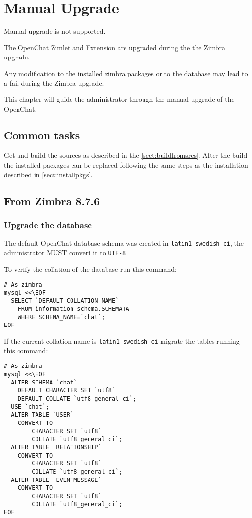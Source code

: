 \section{Manual Upgrade}

\begin{comment}
WARNING:
\end{comment}
\begin{warning}
    Manual upgrade is not supported.

    The OpenChat Zimlet and Extension are upgraded during the the Zimbra upgrade.

    Any modification to the installed zimbra packages or to the database may lead to a fail during the Zimbra upgrade.
\end{warning}

This chapter will guide the administrator through the manual upgrade of the OpenChat.

\subsection{Common tasks}

    Get and build the sources as described in the \autoref{sect:buildfromsrcs}. After the build the installed packages
    can be replaced following the same steps as the installation described in \autoref{sect:installpkgs}.

\subsection{From Zimbra 8.7.6}
    \subsubsection{Upgrade the database}

        The default OpenChat database schema was created in \verb+latin1_swedish_ci+, the administrator MUST convert it to \verb+UTF-8+

        To verify the collation of the database run this command:
        \begin{verbatim}
# As zimbra
mysql <<\EOF
  SELECT `DEFAULT_COLLATION_NAME`
    FROM information_schema.SCHEMATA
    WHERE SCHEMA_NAME=`chat`;
EOF
        \end{verbatim}

        If the current collation name is \verb+latin1_swedish_ci+ migrate the tables running this command:
        \begin{verbatim}
# As zimbra
mysql <<\EOF
  ALTER SCHEMA `chat`
    DEFAULT CHARACTER SET `utf8`
    DEFAULT COLLATE `utf8_general_ci`;
  USE `chat`;
  ALTER TABLE `USER`
    CONVERT TO
        CHARACTER SET `utf8`
        COLLATE `utf8_general_ci`;
  ALTER TABLE `RELATIONSHIP`
    CONVERT TO
        CHARACTER SET `utf8`
        COLLATE `utf8_general_ci`;
  ALTER TABLE `EVENTMESSAGE`
    CONVERT TO
        CHARACTER SET `utf8`
        COLLATE `utf8_general_ci`;
EOF
        \end{verbatim}
